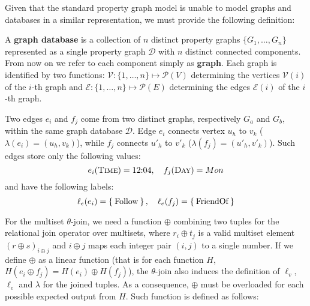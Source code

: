 Given that the standard property graph model is unable to model graphs and databases in a similar representation, we must provide the following definition:

\begin{definition}\label{def:gdb}
	A \textbf{graph database} is a collection of $n$ distinct property graphs $\{G_1,\dots,G_n\}$
	represented as a single 
	property graph $\mathcal{D}$ with $n$ distinct connected
	components. From now on we refer to each component simply 
	as \textbf{graph}. Each graph is identified by
	two functions: $\mathcal{V}\colon \{1,\dots,n\}\mapsto \mathcal{P}(V)$ determining the
	vertices $\mathcal{V}(i)$ of the $i$-th graph and $\mathcal{E}\colon \{1,\dots,n\}\mapsto \mathcal{P}(E)$ determining the edges $\mathcal{E}(i)$ of the $i$-th graph.
\end{definition}

\begin{example}[label=ex:onJoinDataModel]
	Two edges $e_i$ and $f_j$ come from two distinct graphs, respectively $G_a$ and $G_b$, within
	the same graph database $\mathcal{D}$. Edge $e_i$ connects vertex $u_h$ to $v_k$ ($\lambda(e_i)=(u_h,v_k)$), while $f_j$ connects $u'_h$
	to $v'_k$ ($\lambda(f_j)=(u'_h,v'_k)$).
	Such edges store only the following values:
	\[e_i(\textsc{Time})=12\textup{:}04,\quad f_j(\textsc{Day})=Mon\]
	and have the following labels:
	\[\ell_e(e_i)=\Set{\textup{Follow}},\quad\ell_e(f_j)=\Set{\textup{FriendOf}}\]
\end{example}

For the multiset $\theta$-join, we need a function $\oplus$ combining two tuples for the
relational join operator over multisets, where $r_i\oplus t_j$ is a valid
multiset element $(r\oplus s)_{i\oplus j}$ and $i\oplus j$ maps 
each integer pair $(i,j)$ to a single number. If we define $\oplus$ as a linear function (that is for each function 
$H$, $H(e_i\oplus f_j)=H(e_i)\oplus H(f_j)$),
the $\theta$-join also induces the definition of $\ell_v$, $\ell_e$ and $\lambda$ for
the joined tuples. As a consequence, $\oplus$ must be 
overloaded for each possible expected output from $H$. Such function is defined as follows:


